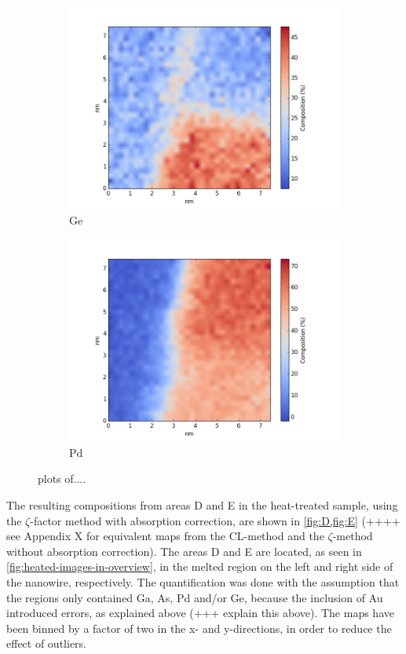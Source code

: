 \begin{figure}
\begin{subfigure}{0.5\textwidth}
		\includegraphics[width=\textwidth]{fig/q/E_heated/_binned_Ge_zetaAbs}
		\caption{Ge}
		\label{fig:Ege}
	\end{subfigure}%
	\hfill
	\begin{subfigure}{0.5\textwidth}
		\includegraphics[width=\textwidth]{fig/q/E_heated/_binned_Pd_zetaAbs}
		\caption{Pd}
		\label{fig:Epd}
	\end{subfigure}
	\caption{plots of....}
	\label{fig:E}
\end{figure}

The resulting compositions from areas D and E in the heat-treated sample, using the $\zeta$-factor method with absorption correction, are shown in \cref{fig:D,fig:E} (++++ see Appendix X for equivalent maps from the CL-method and the $\zeta$-method without absorption correction). The areas D and E are located, as seen in \cref{fig:heated-images-in-overview}, in the melted region on the left and right side of the nanowire, respectively. The quantification was done with the assumption that the regions only contained Ga, As, Pd and/or Ge, because the inclusion of Au introduced errors, as explained above (+++ explain this above). The maps have been binned by a factor of two in the x- and y-directions, in order to reduce the effect of outliers.

